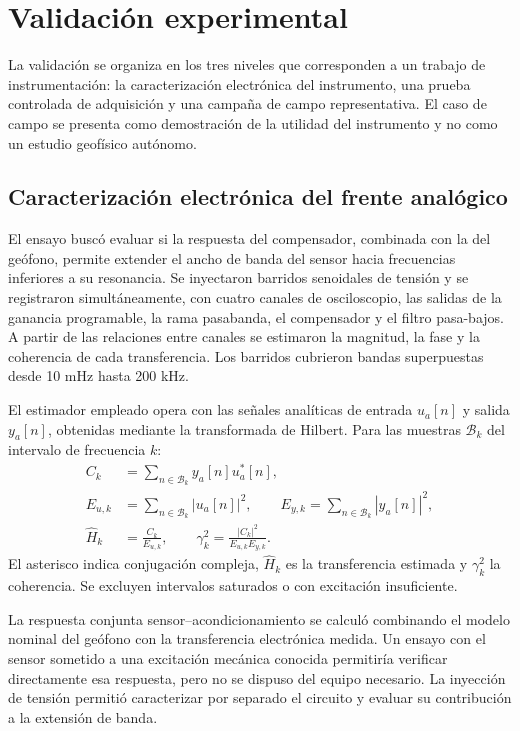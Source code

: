 \section{Validación experimental}
\label{sec:validacion}

La validación se organiza en los tres niveles que corresponden a un trabajo de instrumentación: la caracterización electrónica del instrumento, una prueba controlada de adquisición y una campaña de campo representativa. El caso de campo se presenta como demostración de la utilidad del instrumento y no como un estudio geofísico autónomo.

\subsection{Caracterización electrónica del frente analógico}
\label{sec:ensayo-electronico}

El ensayo buscó evaluar si la respuesta del compensador, combinada con la del geófono, permite extender el ancho de banda del sensor hacia frecuencias inferiores a su resonancia. Se inyectaron barridos senoidales de tensión y se registraron simultáneamente, con cuatro canales de osciloscopio, las salidas de la ganancia programable, la rama pasabanda, el compensador y el filtro pasa-bajos. A partir de las relaciones entre canales se estimaron la magnitud, la fase y la coherencia de cada transferencia. Los barridos cubrieron bandas superpuestas desde 10 mHz hasta 200 kHz.

El estimador empleado opera con las señales analíticas de entrada $u_a[n]$ y salida $y_a[n]$, obtenidas mediante la transformada de Hilbert. Para las muestras $\mathcal B_k$ del intervalo de frecuencia $k$:
\begin{equation}
\begin{aligned}
C_k&=\sum_{n\in\mathcal B_k}y_a[n]u_a^*[n],\\
E_{u,k}&=\sum_{n\in\mathcal B_k}|u_a[n]|^2,\qquad
E_{y,k}=\sum_{n\in\mathcal B_k}|y_a[n]|^2,\\
\widehat H_k&=\frac{C_k}{E_{u,k}},\qquad
\gamma_k^2=\frac{|C_k|^2}{E_{u,k}E_{y,k}}.
\end{aligned}
\label{eq:estimacion-transferencia}
\end{equation}
El asterisco indica conjugación compleja, $\widehat H_k$ es la transferencia estimada y $\gamma_k^2$ la coherencia. Se excluyen intervalos saturados o con excitación insuficiente.

La respuesta conjunta sensor--acondicionamiento se calculó combinando el modelo nominal del geófono con la transferencia electrónica medida. Un ensayo con el sensor sometido a una excitación mecánica conocida permitiría verificar directamente esa respuesta, pero no se dispuso del equipo necesario. La inyección de tensión permitió caracterizar por separado el circuito y evaluar su contribución a la extensión de banda.

